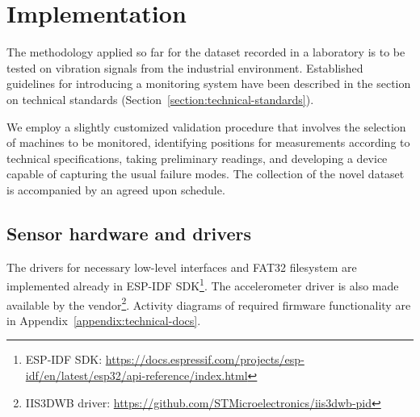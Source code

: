 \chapter{Implementation} \label{section:implementation} 
The methodology applied so far for the dataset recorded in a laboratory is to be tested on vibration signals from the industrial environment. Established guidelines for introducing a monitoring system have been described in the section on technical standards (Section~\ref{section:technical-standards}). 

We employ a slightly customized validation procedure that involves the selection of machines to be monitored, identifying positions for measurements according to technical specifications, taking preliminary readings, and developing a device capable of capturing the usual failure modes. The collection of the novel dataset is accompanied by an agreed upon schedule.


\section{Sensor hardware and drivers}


The drivers for necessary low-level interfaces and FAT32 filesystem are  implemented already in ESP-IDF SDK\footnote{ESP-IDF SDK: \url{https://docs.espressif.com/projects/esp-idf/en/latest/esp32/api-reference/index.html}}. The accelerometer driver is also made available by the vendor\footnote{IIS3DWB driver: \url{https://github.com/STMicroelectronics/iis3dwb-pid}}. Activity diagrams of required firmware functionality are in Appendix~\ref{appendix:technical-docs}.





